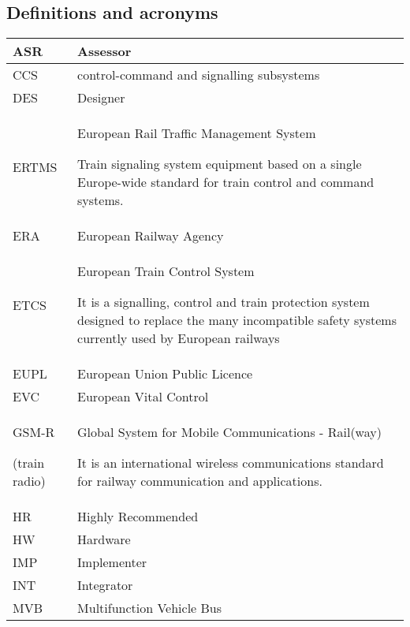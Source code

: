 \documentclass{template/openetcs_article}
\begin{document}
\subsection{Definitions and acronyms}
\tablehead{}
\tabletail{}
\tablelasttail{}
\begin{supertabular}{|m{3cm}m{11cm}|}
\hline
ASR &
Assessor\\\hline
CCS &
control-command and signalling subsystems  \\\hline
DES &
Designer\\\hline
ERTMS &
European Rail Traffic Management System

Train signaling system equipment based on a single Europe-wide standard for train control and command systems.\\\hline
ERA &
European Railway Agency\\\hline
ETCS &
European Train Control System

It is a signalling, control and train protection system designed to replace the many incompatible safety systems currently used by European railways\\\hline
EUPL &
European Union Public Licence\\\hline
EVC &
European Vital Control\\\hline
GSM-R

(train radio) &
Global System for Mobile Communications - Rail(way)

It is an international wireless communications standard for railway communication and applications.\\\hline
HR &
Highly Recommended\\\hline
HW &
Hardware\\\hline
IMP &
Implementer\\\hline
INT &
Integrator\\\hline
MVB &
Multifunction Vehicle Bus


\end{supertabular}
\end{document}
